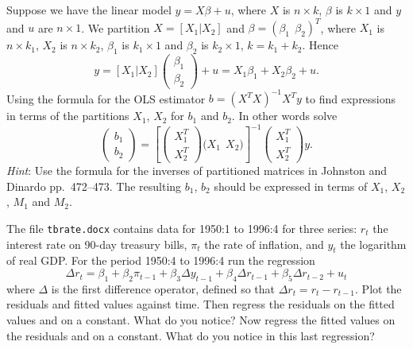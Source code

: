 \documentclass[11pt]{article}
\begin{document}

Suppose we have the linear model $y = X\beta + u$, where $X$ is $n \times k$,
$\beta$ is $k \times 1$ and $y$ and $u$ are $n \times 1$. We partition
$X = [X_{1}|X_{2}]$ and $\beta = (\beta_{1}\ \ \beta_{2})^{T}$, where $X_{1}$ is
$n \times k_{1}$, $X_{2}$ is $n \times k_{2}$, $\beta_{1}$ is $k_{1} \times 1$
and $\beta_{2}$ is $k_{2} \times 1$, $k = k_{1} + k_{2}$. Hence
\[
  y = [X_{1}|X_{2}]
      \begin{pmatrix} \beta_{1} \\ \beta_{2} \end{pmatrix}
    + u
    = X_{1}\beta_{1} + X_{2}\beta_{2} + u .
\]
Using the formula for the OLS estimator $b = (X^{T}X)^{-1}X^{T}y$ to find
expressions in terms of the partitions $X_{1}$, $X_{2}$ for $b_{1}$ and $b_{2}$.
In other words solve
\[
  \begin{pmatrix} b_{1} \\ b_{2} \end{pmatrix}
  = \left[
      \begin{pmatrix} X_{1}^{T} \\ X_{2}^{T} \end{pmatrix}
      \bigl( X_{1}\ \ X_{2} \bigr)
    \right]^{-1}
    \begin{pmatrix} X_{1}^{T} \\ X_{2}^{T} \end{pmatrix} y .
\]
\emph{Hint}: Use the formula for the inverses of partitioned matrices in
Johnston and Dinardo pp.\ 472--473. The resulting $b_{1}$, $b_{2}$ should be
expressed in terms of $X_{1}$, $X_{2}$, $M_{1}$ and $M_{2}$.

The file \texttt{tbrate.docx} contains data for 1950:1 to 1996:4 for three
series: $r_{t}$ the interest rate on 90-day treasury bills, $\pi_{t}$ the rate
of inflation, and $y_{t}$ the logarithm of real GDP. For the period 1950:4 to
1996:4 run the regression
\begin{equation}\tag{1}
  \Delta r_{t} = \beta_{1} + \beta_{2}\pi_{t-1} + \beta_{3}\Delta y_{t-1}
                 + \beta_{4}\Delta r_{t-1} + \beta_{5}\Delta r_{t-2} + u_{t}
\end{equation}
where $\Delta$ is the first difference operator, defined so that
$\Delta r_{t} = r_{t} - r_{t-1}$. Plot the residuals and fitted values against
time. Then regress the residuals on the fitted values and on a constant. What do
you notice? Now regress the fitted values on the residuals and on a constant.
What do you notice in this last regression?
\end{document}

